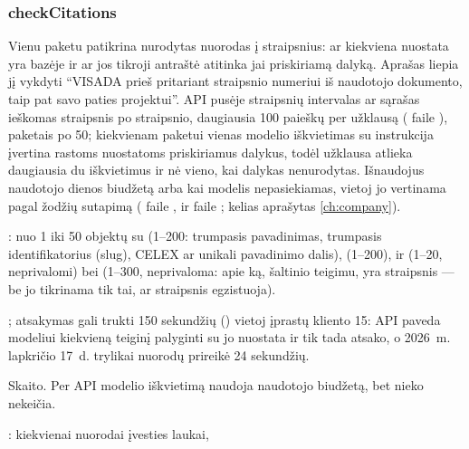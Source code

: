 \subsubsection{checkCitations}\label{sec:tools:checkCitations}
\begin{description}[style=multiline, leftmargin=19mm, labelwidth=17mm, labelsep=2mm,
  font=\sffamily\bfseries\footnotesize\color{ink}, itemsep=1pt, topsep=2pt, before=\raggedright]
  \item[Paskirtis] Vienu paketu patikrina nurodytas nuorodas į straipsnius: ar kiekviena
    nuostata yra bazėje ir ar jos tikroji antraštė atitinka jai priskiriamą dalyką. Aprašas
    liepia jį vykdyti \enquote{VISADA prieš pritariant straipsnio numeriui iš naudotojo
    dokumento, taip pat savo paties projektui}. API pusėje straipsnių intervalas ar sąrašas
    ieškomas straipsnis po straipsnio, daugiausia 100 paieškų per užklausą (
    faile ), paketais po 50; kiekvienam paketui vienas modelio iškvietimas su
    instrukcija  įvertina rastoms nuostatoms
    priskiriamus dalykus, todėl užklausa atlieka daugiausia du iškvietimus ir nė vieno, kai
    dalykas nenurodytas. Išnaudojus naudotojo dienos biudžetą arba kai modelis nepasiekiamas,
    vietoj jo vertinama pagal žodžių sutapimą ( faile ,
     ir  faile ; kelias
    aprašytas \cref{ch:company}).
  \item[Įvestis] : nuo 1 iki 50 objektų su  (1--200: trumpasis
    pavadinimas, trumpasis identifikatorius (slug), CELEX ar unikali pavadinimo dalis),
     (1--200),  ir  (1--20, neprivalomi) bei
     (1--300, neprivaloma: apie ką, šaltinio teigimu, yra straipsnis ---
    be jo tikrinama tik tai, ar straipsnis egzistuoja).
  \item[Užklausos] ; atsakymas gali trukti 150
    sekundžių () vietoj įprastų kliento 15: API paveda modeliui kiekvieną
    teiginį palyginti su jo nuostata ir tik tada atsako, o 2026~m. lapkričio 17~d. trylikai
    nuorodų prireikė 24 sekundžių.
  \item[Pobūdis] Skaito. Per API modelio iškvietimą naudoja naudotojo biudžetą, bet nieko
    nekeičia.
  \item[Grąžina] : kiekvienai nuorodai įvesties laukai, 

\end{description}
